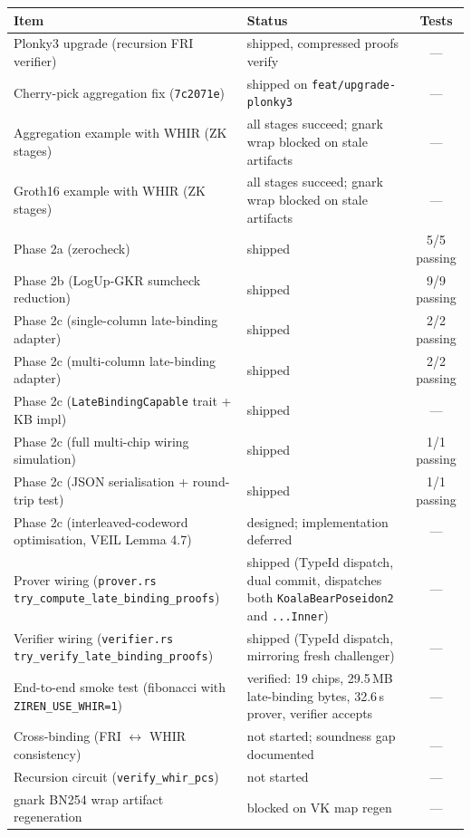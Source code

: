 \begin{tabularx}{\textwidth}{@{}lXc@{}}
\toprule
\textbf{Item} & \textbf{Status} & \textbf{Tests} \\
\midrule
Plonky3 upgrade (recursion FRI verifier) & shipped, compressed proofs verify & --- \\
Cherry-pick aggregation fix (\texttt{7c2071e}) & shipped on \texttt{feat/upgrade-plonky3} & --- \\
Aggregation example with WHIR (ZK stages) & all stages succeed; gnark wrap blocked on stale artifacts & --- \\
Groth16 example with WHIR (ZK stages) & all stages succeed; gnark wrap blocked on stale artifacts & --- \\
Phase 2a (zerocheck) & shipped & 5/5 passing \\
Phase 2b (LogUp-GKR sumcheck reduction) & shipped & 9/9 passing \\
Phase 2c (single-column late-binding adapter) & shipped & 2/2 passing \\
Phase 2c (multi-column late-binding adapter) & shipped & 2/2 passing \\
Phase 2c (\texttt{LateBindingCapable} trait + KB impl) & shipped & --- \\
Phase 2c (full multi-chip wiring simulation) & shipped & 1/1 passing \\
Phase 2c (JSON serialisation + round-trip test) & shipped & 1/1 passing \\
Phase 2c (interleaved-codeword optimisation, VEIL Lemma 4.7) & designed; implementation deferred & --- \\
Prover wiring (\texttt{prover.rs} \texttt{try\_compute\_late\_binding\_proofs}) & shipped (TypeId dispatch, dual commit, dispatches both \texttt{KoalaBearPoseidon2} and \texttt{...Inner}) & --- \\
Verifier wiring (\texttt{verifier.rs} \texttt{try\_verify\_late\_binding\_proofs}) & shipped (TypeId dispatch, mirroring fresh challenger) & --- \\
End-to-end smoke test (fibonacci with \texttt{ZIREN\_USE\_WHIR=1}) & verified: 19 chips, 29.5\,MB late-binding bytes, 32.6\,s prover, verifier accepts & --- \\
Cross-binding (FRI $\leftrightarrow$ WHIR consistency) & not started; soundness gap documented & --- \\
Recursion circuit (\texttt{verify\_whir\_pcs}) & not started & --- \\
gnark BN254 wrap artifact regeneration & blocked on VK map regen & --- \\
\bottomrule
\end{tabularx}
